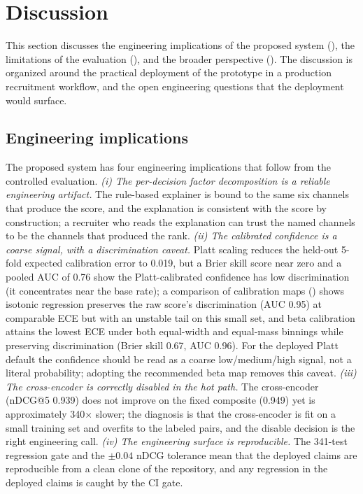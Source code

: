 \section{Discussion}\label{sec:6}

This section discusses the engineering implications of the proposed system (), the limitations of the evaluation (), and the broader perspective ().
The discussion is organized around the practical deployment of the prototype in a production recruitment workflow, and the open engineering questions that the deployment would surface.

\subsection{Engineering implications}\label{sec:6.1}
The proposed system has four engineering implications that follow from the controlled evaluation.
\emph{(i) The per-decision factor decomposition is a reliable engineering artifact.} The rule-based explainer is bound to the same six channels that produce the score, and the explanation is consistent with the score by construction; a recruiter who reads the explanation can trust the named channels to be the channels that produced the rank.
\emph{(ii) The calibrated confidence is a coarse signal, with a discrimination caveat.} Platt scaling reduces the held-out 5-fold expected calibration error to 0.019, but a Brier skill score near zero and a pooled AUC of 0.76 show the Platt-calibrated confidence has low discrimination (it concentrates near the base rate); a comparison of calibration maps () shows isotonic regression preserves the raw score's discrimination (AUC 0.95) at comparable ECE but with an unstable tail on this small set, and beta calibration attains the lowest ECE under both equal-width and equal-mass binnings while preserving discrimination (Brier skill 0.67, AUC 0.96). For the deployed Platt default the confidence should be read as a coarse low/medium/high signal, not a literal probability; adopting the recommended beta map removes this caveat.
\emph{(iii) The cross-encoder is correctly disabled in the hot path.} The cross-encoder (nDCG@5 0.939) does not improve on the fixed composite (0.949) yet is approximately 340$\times$ slower; the diagnosis is that the cross-encoder is fit on a small training set and overfits to the labeled pairs, and the disable decision is the right engineering call.
\emph{(iv) The engineering surface is reproducible.} The 341-test regression gate and the $\pm 0.04$ nDCG tolerance mean that the deployed claims are reproducible from a clean clone of the repository, and any regression in the deployed claims is caught by the CI gate.

